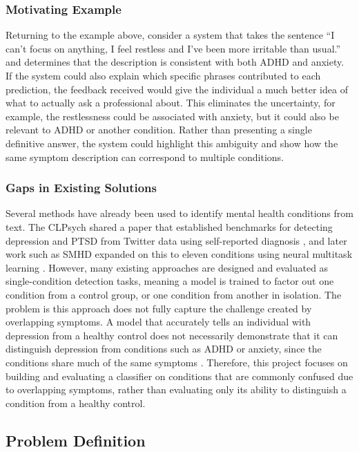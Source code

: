 \documentclass[sigconf]{acmart}
\begin{document}
\subsubsection{Motivating Example}

Returning to the example above, consider a system that takes the sentence “I can’t focus on anything, I feel restless and I’ve been more irritable than usual.” and determines that the description is consistent with both ADHD and anxiety. If the system could also explain which specific phrases contributed to each prediction, the feedback received would give the individual a much better idea of what to actually ask a professional about. This eliminates the uncertainty, for example, the restlessness could be associated with anxiety, but it could also be relevant to ADHD or another condition. Rather than presenting a single definitive answer, the system could highlight this ambiguity and show how the same symptom description can correspond to multiple conditions.

\subsubsection{Gaps in Existing Solutions}

Several methods have already been used to identify mental health conditions from text. The CLPsych shared a paper that established benchmarks for detecting depression and PTSD from Twitter data using self-reported diagnosis \cite{coppersmith2015clpsych}, and later work such as SMHD expanded on this to eleven conditions using neural multitask learning \cite{cohan2018smhd}. However, many existing approaches are designed and evaluated as single-condition detection tasks, meaning a model is trained to factor out one condition from a control group, or one condition from another in isolation. The problem is this approach does not fully capture the challenge created by overlapping symptoms. A model that accurately tells an individual with depression from a healthy control does not necessarily demonstrate that it can distinguish depression from conditions such as ADHD or anxiety, since the conditions share much of the same symptoms \cite{liu2025adhdcomorbidity}. Therefore, this project focuses on building and evaluating a classifier on conditions that are commonly confused due to overlapping symptoms, rather than evaluating only its ability to distinguish a condition from a healthy control.


\subsection{Problem Definition}
\end{document}
